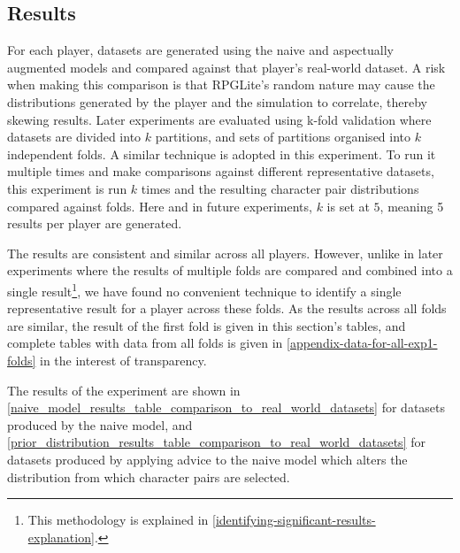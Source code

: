 \subsection{Results}


For each player, datasets are generated using the naive and aspectually
augmented models and compared against that player's real-world dataset. A risk
when making this comparison is that RPGLite's random nature may cause the
distributions generated by the player and the simulation to correlate, thereby
skewing results. Later experiments are evaluated using k-fold validation where
datasets are divided into $k$ partitions, and sets of partitions organised into
$k$ independent folds. A similar technique is adopted in this experiment. To run
it multiple times and make comparisons against different representative
datasets, this experiment is run $k$ times and the resulting character pair
distributions compared against folds. Here and in future experiments, $k$ is set
at $5$, meaning 5 results per player are generated.

The results are consistent and similar across all players. However, unlike in
later experiments where the results of multiple folds are compared and combined
into a single result\footnote{This methodology is explained in
\cref{identifying-significant-results-explanation}.}, we have found no convenient
technique to identify a single representative result for a player across these
folds. As the results across all folds are similar, the result of the first fold
is given in this section's tables, and complete tables with data from all folds
is given in \cref{appendix-data-for-all-exp1-folds} in the interest of transparency.

The results of the experiment are shown in
\cref{naive_model_results_table_comparison_to_real_world_datasets} for datasets
produced by the naive model, and
\cref{prior_distribution_results_table_comparison_to_real_world_datasets} for
datasets produced by applying advice to the naive model which alters the
distribution from which character pairs are selected. 

